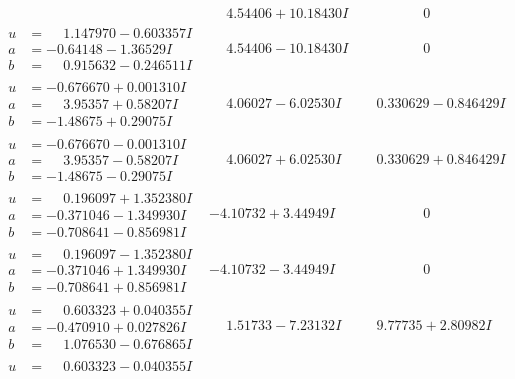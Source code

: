 \documentclass[1p]{elsarticle_modified}
\theoremstyle{definition}
\begin{document}
$$\begin{array}{c|c|c}
 & \phantom{-}4.54406 + 10.18430 I & \phantom{-0.000000 } 0 \\ \hline\begin{aligned}
u &= \phantom{-}1.147970 - 0.603357 I \\
a &= -0.64148 - 1.36529 I \\
b &= \phantom{-}0.915632 - 0.246511 I\end{aligned}
 & \phantom{-}4.54406 - 10.18430 I & \phantom{-0.000000 } 0 \\ \hline\begin{aligned}
u &= -0.676670 + 0.001310 I \\
a &= \phantom{-}3.95357 + 0.58207 I \\
b &= -1.48675 + 0.29075 I\end{aligned}
 & \phantom{-}4.06027 - 6.02530 I & \phantom{-}0.330629 - 0.846429 I \\ \hline\begin{aligned}
u &= -0.676670 - 0.001310 I \\
a &= \phantom{-}3.95357 - 0.58207 I \\
b &= -1.48675 - 0.29075 I\end{aligned}
 & \phantom{-}4.06027 + 6.02530 I & \phantom{-}0.330629 + 0.846429 I \\ \hline\begin{aligned}
u &= \phantom{-}0.196097 + 1.352380 I \\
a &= -0.371046 - 1.349930 I \\
b &= -0.708641 - 0.856981 I\end{aligned}
 & -4.10732 + 3.44949 I & \phantom{-0.000000 } 0 \\ \hline\begin{aligned}
u &= \phantom{-}0.196097 - 1.352380 I \\
a &= -0.371046 + 1.349930 I \\
b &= -0.708641 + 0.856981 I\end{aligned}
 & -4.10732 - 3.44949 I & \phantom{-0.000000 } 0 \\ \hline\begin{aligned}
u &= \phantom{-}0.603323 + 0.040355 I \\
a &= -0.470910 + 0.027826 I \\
b &= \phantom{-}1.076530 - 0.676865 I\end{aligned}
 & \phantom{-}1.51733 - 7.23132 I & \phantom{-}9.77735 + 2.80982 I \\ \hline\begin{aligned}
u &= \phantom{-}0.603323 - 0.040355 I \\

\end{aligned}
\end{array}$$
\end{document}
